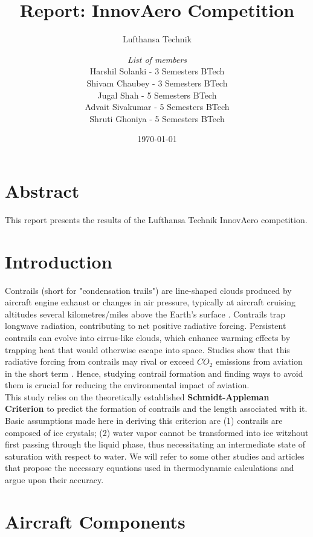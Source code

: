 \documentclass[a4paper, 12pt]{report}
\institute{{\bfseries\Huge Team Rakshak}\\\vspace{10pt}Indian Institute of Technology Bombay}
\title{Report: InnovAero Competition}
\subtitle{Lufthansa Technik}
\author{\textit{List of members}\\
        Harshil Solanki - 3 Semesters BTech\\
        Shivam Chaubey - 3 Semesters BTech\\
        Jugal Shah - 5 Semesters BTech\\
        Advait Sivakumar - 5 Semesters BTech\\
        Shruti Ghoniya - 5 Semesters BTech
}
\date{\today}
\begin{document}
\maketitle
\romantableofcontents

\chapter{Abstract}
This report presents the results of the Lufthansa Technik InnovAero competition.

\chapter{Introduction}
Contrails (short for "condensation trails") are line-shaped clouds produced by aircraft engine exhaust or changes in air pressure, typically at aircraft cruising altitudes several kilometres/miles above the Earth's surface \cite{enwiki:1250066651}. Contrails trap longwave radiation, contributing to net positive radiative forcing. Persistent contrails can evolve into cirrus-like clouds, which enhance warming effects by trapping heat that would otherwise escape into space. Studies show that this radiative forcing from contrails may rival or exceed $CO_2$ emissions from aviation in the short term \cite{acp}. Hence, studying contrail formation and finding ways to avoid them is crucial for reducing the environmental impact of aviation. \\

This study relies on the theoretically established \textbf{Schmidt-Appleman Criterion} \cite{appleman1953formation} to predict the formation of contrails and the length associated with it. Basic assumptions made here in deriving this criterion are (1) contrails are composed of ice crystals; (2) water vapor cannot
be transformed into ice witzhout first passing through the liquid phase, thus necessitating an
intermediate state of saturation with respect to water. We will refer to some other studies and articles that propose the necessary equations used in thermodynamic calculations and argue upon their accuracy. \\

\chapter{Aircraft Components}
\end{document}
